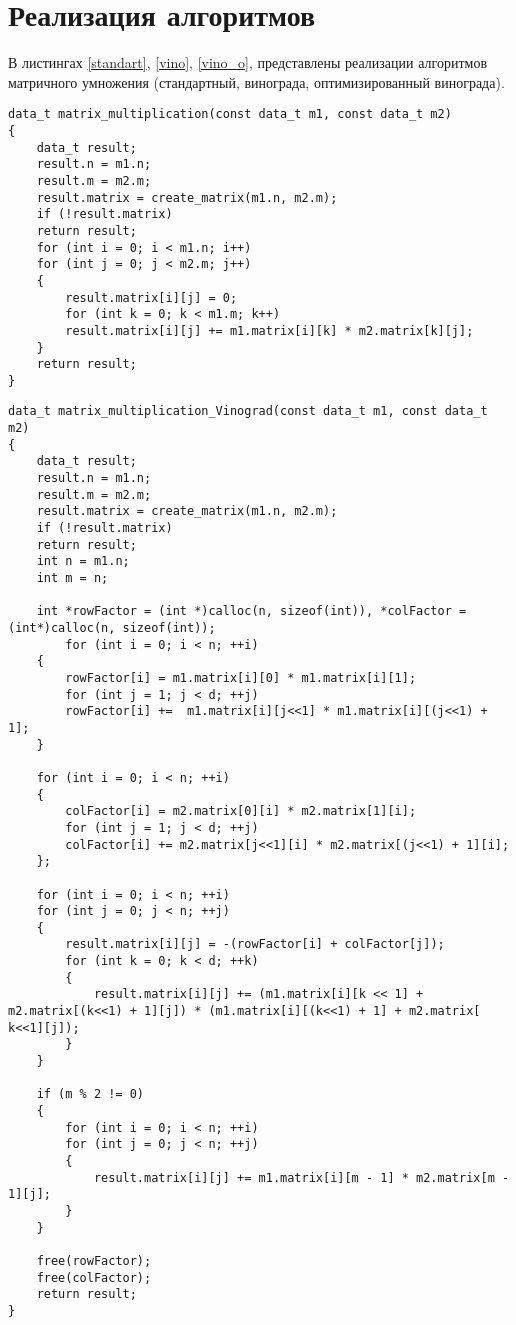 \section{Реализация алгоритмов}
В листингах \ref{standart}, \ref{vino}, \ref{vino_o}, представлены реализации алгоритмов матричного умножения (стандартный, винограда, оптимизированный винограда). 
\begin{center}
\begin{lstlisting}[label=standart, caption={Стандартный алгоритм умножения матриц}]
data_t matrix_multiplication(const data_t m1, const data_t m2)
{
	data_t result;
	result.n = m1.n;
	result.m = m2.m;
	result.matrix = create_matrix(m1.n, m2.m);
	if (!result.matrix)
	return result;
	for (int i = 0; i < m1.n; i++)
	for (int j = 0; j < m2.m; j++)
	{
		result.matrix[i][j] = 0;
		for (int k = 0; k < m1.m; k++)
		result.matrix[i][j] += m1.matrix[i][k] * m2.matrix[k][j];
	}
	return result;
}
\end{lstlisting}
\end{center}
\newpage
\begin{center}
\begin{lstlisting}[label=vino, caption={Алгоритм Винограда умножения матриц}]
data_t matrix_multiplication_Vinograd(const data_t m1, const data_t m2)
{
	data_t result;
	result.n = m1.n;
	result.m = m2.m;
	result.matrix = create_matrix(m1.n, m2.m);
	if (!result.matrix)
	return result;
	int n = m1.n;
	int m = n;
	
	int *rowFactor = (int *)calloc(n, sizeof(int)), *colFactor = (int*)calloc(n, sizeof(int));
		for (int i = 0; i < n; ++i)
	{
		rowFactor[i] = m1.matrix[i][0] * m1.matrix[i][1];
		for (int j = 1; j < d; ++j)
		rowFactor[i] +=  m1.matrix[i][j<<1] * m1.matrix[i][(j<<1) + 1];
	}
	
	for (int i = 0; i < n; ++i)
	{
		colFactor[i] = m2.matrix[0][i] * m2.matrix[1][i];
		for (int j = 1; j < d; ++j)
		colFactor[i] += m2.matrix[j<<1][i] * m2.matrix[(j<<1) + 1][i];
	};
	
	for (int i = 0; i < n; ++i)
	for (int j = 0; j < n; ++j)
	{
		result.matrix[i][j] = -(rowFactor[i] + colFactor[j]);
		for (int k = 0; k < d; ++k)
		{
			result.matrix[i][j] += (m1.matrix[i][k << 1] + m2.matrix[(k<<1) + 1][j]) * (m1.matrix[i][(k<<1) + 1] + m2.matrix[ k<<1][j]);
		}
	}
	
	if (m % 2 != 0)
	{
		for (int i = 0; i < n; ++i)
		for (int j = 0; j < n; ++j)
		{
			result.matrix[i][j] += m1.matrix[i][m - 1] * m2.matrix[m - 1][j];
		}
	}

	free(rowFactor);
	free(colFactor);
	return result;
}
\end{lstlisting}
\end{center}
